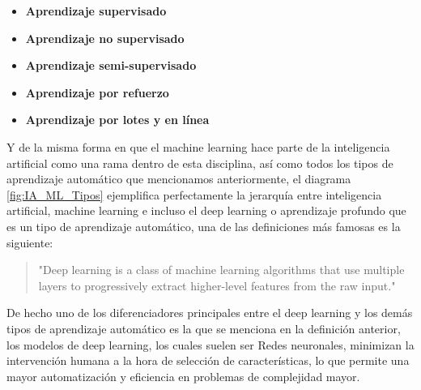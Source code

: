 \begin{itemize}
	\item \textbf{Aprendizaje supervisado}
	\item \textbf{Aprendizaje no supervisado}	\item \textbf{Aprendizaje semi-supervisado}
	\item \textbf{Aprendizaje por refuerzo}
	\item \textbf{Aprendizaje por lotes y en línea}
\end{itemize}

Y de la misma forma en que el machine learning hace parte de la inteligencia artificial como una rama dentro de esta disciplina, así como todos los tipos de aprendizaje automático que mencionamos anteriormente, el diagrama \ref{fig:IA_ML_Tipos} ejemplifica perfectamente la jerarquía entre inteligencia artificial, machine learning e incluso el deep learning o aprendizaje profundo que es un tipo de aprendizaje automático, una de las definiciones más famosas es la siguiente:

\begin{quote}
	\small
	"Deep learning is a class of machine learning algorithms that use multiple layers to progressively extract higher-level features from the raw input."
	
	\begin{flushright}
		\citet{lecun2015deep}
	\end{flushright}
\end{quote}

De hecho uno de los diferenciadores principales entre el deep learning y los demás tipos de aprendizaje automático es la que se menciona en la definición anterior, los modelos de deep learning, los cuales suelen ser Redes neuronales, minimizan la intervención humana a la hora de selección de características, lo que permite una mayor automatización y eficiencia en problemas de complejidad mayor.

